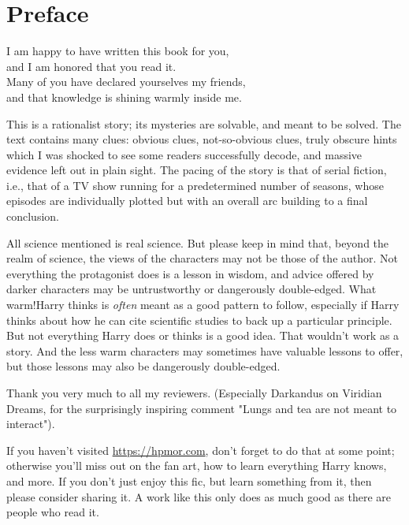 \chapter*{Preface}

I am happy to have written this book for you,\\
and I am honored that you read it.\\
Many of you have declared yourselves my friends,\\
and that knowledge is shining warmly inside me.
~

This is a rationalist story; its mysteries are solvable, and meant to be solved. The text contains many clues: obvious clues, not-so-obvious clues, truly obscure hints which I was shocked to see some readers successfully decode, and massive evidence left out in plain sight. 
The pacing of the story is that of serial fiction, i.e., that of a TV show running for a predetermined number of seasons, whose episodes are individually plotted but with an overall arc building to a final conclusion.


All science mentioned is real science. But please keep in mind that, beyond the realm of science, the views of the characters may not be those of the author. Not everything the protagonist does is a lesson in wisdom, and advice offered by darker characters may be untrustworthy or dangerously double-edged.
What warm!Harry thinks is \emph{often} meant as a good pattern to follow, especially if Harry thinks about how he can cite scientific studies to back up a particular principle. But not everything Harry does or thinks is a good idea. That wouldn’t work as a story. And the less warm characters may sometimes have valuable lessons to offer, but those lessons may also be dangerously double-edged.

Thank you very much to all my reviewers. (Especially Darkandus on Viridian Dreams, for the surprisingly inspiring comment "Lungs and tea are not meant to interact").

If you haven’t visited \url{https://hpmor.com}, don’t forget to do that at some point; otherwise you'll miss out on the fan art, how to learn everything Harry knows, and more. If you don’t just enjoy this fic, but learn something from it, then please consider sharing it. A work like this only does as much good as there are people who read it.

